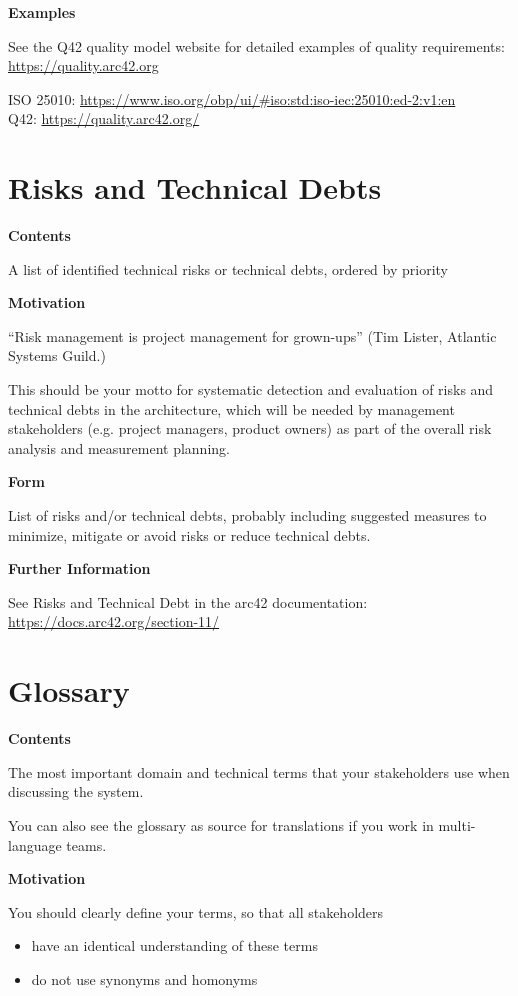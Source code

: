 \documentclass[12pt,a4paper]{article}
\newcommand{\minititle}[1]{%
  \par\addvspace{0.6\baselineskip}%
  \noindent\textbf{#1}\par\nobreak%
  \noindent\ignorespaces%
}
\begin{document}
\minititle{Examples}
See the Q42 quality model website for detailed examples of quality requirements:
\href{https://quality.arc42.org/}{https://quality.arc42.org}

ISO 25010: \href{https://www.iso.org/obp/ui/\#iso:std:iso-iec:25010:ed-2:v1:en}{https://www.iso.org/obp/ui/\#iso:std:iso-iec:25010:ed-2:v1:en}\\
Q42: \href{https://quality.arc42.org/}{https://quality.arc42.org/}

\section{Risks and Technical Debts}

\minititle{Contents}
A list of identified technical risks or technical debts, ordered by priority

\minititle{Motivation}
“Risk management is project management for grown-ups” (Tim Lister, Atlantic Systems Guild.)

This should be your motto for systematic detection and evaluation of risks and technical debts in the architecture, which will be needed by management stakeholders (e.g. project managers, product owners) as part of the overall risk analysis and measurement planning.

\minititle{Form}
List of risks and/or technical debts, probably including suggested measures to minimize, mitigate or avoid risks or reduce technical debts.

\minititle{Further Information}
See Risks and Technical Debt in the arc42 documentation:
\href{https://docs.arc42.org/section-11/}{https://docs.arc42.org/section-11/}

\section{Glossary}

\minititle{Contents}
The most important domain and technical terms that your stakeholders use when discussing the system.

You can also see the glossary as source for translations if you work in multi-language teams.

\minititle{Motivation}
You should clearly define your terms, so that all stakeholders
\begin{itemize}
  \item have an identical understanding of these terms
  \item do not use synonyms and homonyms
\end{itemize}
\end{document}
